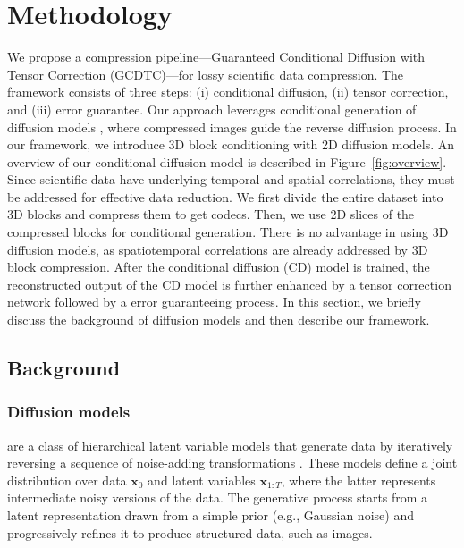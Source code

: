 \section{Methodology}

We propose a compression pipeline---Guaranteed Conditional Diffusion with Tensor Correction (GCDTC)---for lossy scientific data compression. The framework consists of three steps: (i) conditional diffusion, (ii) tensor correction, and (iii) error guarantee. Our approach leverages conditional generation of diffusion models \cite{Yang2023cd}, where compressed images guide the reverse diffusion process. In our framework, we introduce 3D block conditioning with 2D diffusion models. An overview of our conditional diffusion model is described in Figure~\ref{fig:overview}. Since scientific data have underlying temporal and spatial correlations, they must be addressed for effective data reduction. We first divide the entire dataset into 3D blocks and compress them to get codecs. Then, we use 2D slices of the compressed blocks for conditional generation. There is no advantage in using 3D diffusion models, as spatiotemporal correlations are already addressed by 3D block compression. After the conditional diffusion (CD) model is trained, the reconstructed output of the CD model is further enhanced by a tensor correction network followed by a error guaranteeing process. In this section, we briefly discuss the background of diffusion models and then describe our framework.


\subsection{Background}
\subsubsection{Diffusion models} are a class of hierarchical latent variable models that generate data by iteratively reversing a sequence of noise-adding transformations \cite{Sohl2015,Song2019,Ho2020,Song2021,yu2025robust}. These models define a joint distribution over data $\boldsymbol{x}_0$ and latent variables $\boldsymbol{x}_{1:T}$, where the latter represents intermediate noisy versions of the data. The generative process starts from a latent representation drawn from a simple prior (e.g., Gaussian noise) and progressively refines it to produce structured data, such as images.

